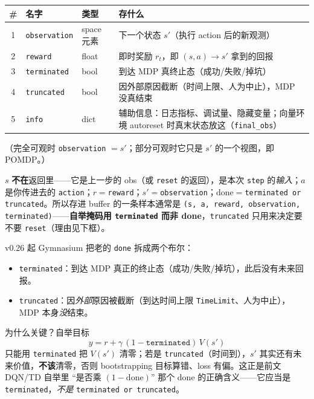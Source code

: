\documentclass[11pt,a4paper]{article}
\begin{document}
\begin{center}
\small
\begin{tabular}{c l l p{7.0cm}}
\toprule
\# & \textbf{名字} & \textbf{类型} & \textbf{存什么} \\
\midrule
1 & \texttt{observation} & space 元素 & 下一个状态 $s'$（执行 action 后的新观测） \\
2 & \texttt{reward} & float & 即时奖励 $r_t$，即 $(s,a)\to s'$ 拿到的回报 \\
3 & \texttt{terminated} & bool & 到达 MDP 真终止态（成功/失败/掉坑） \\
4 & \texttt{truncated} & bool & 因外部原因截断（时间上限、人为中止），MDP 没真结束 \\
5 & \texttt{info} & dict & 辅助信息：日志指标、调试量、隐藏变量；向量环境 autoreset 时真末状态放这（\texttt{final\_obs}） \\
\bottomrule
\end{tabular}
\end{center}

\noindent（完全可观时 \texttt{observation} $=s'$；部分可观时它只是 $s'$ 的一个视图，即 POMDP。）

\begin{keybox}
$s$ \textbf{不在}返回里——它是上一步的 obs（或 \texttt{reset} 的返回），是本次 \texttt{step} 的\emph{输入}；$a$ 是你传进去的 \texttt{action}；$r=$\texttt{reward}；$s'=$\texttt{observation}；$\mathrm{done}=$\texttt{terminated or truncated}。所以存进 buffer 的一条样本通常是 \texttt{(s, a, reward, observation, terminated)}——\textbf{自举掩码用 \texttt{terminated} 而非 done}，\texttt{truncated} 只用来决定要不要 \texttt{reset}（理由见下框）。
\end{keybox}

\begin{tiebox}
v0.26 起 Gymnasium 把老的 \texttt{done} 拆成两个布尔：
\begin{itemize}
\item \texttt{terminated}：到达 MDP 真正的终止态（成功/失败/掉坑），此后没有未来回报。
\item \texttt{truncated}：因\emph{外部}原因被截断（到达时间上限 \texttt{TimeLimit}、人为中止），MDP 本身\emph{没}结束。
\end{itemize}
为什么关键？自举目标
\[
y=r+\gamma\,(1-\texttt{terminated})\,V(s')
\]
只能用 \texttt{terminated} 把 $V(s')$ 清零；若是 \texttt{truncated}（时间到），$s'$ 其实还有未来价值，\textbf{不该}清零，否则 bootstrapping 目标算错、loss 有偏。这正是前文 DQN/TD 自举里 “是否乘 $(1-\text{done})$” 那个 done 的正确含义——它应当是 \texttt{terminated}，\emph{不是} \texttt{terminated or truncated}。
\end{tiebox}
\end{document}
